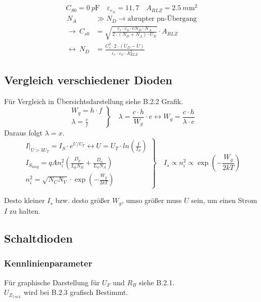 \documentclass[
	a4paper, %
	12pt, %
]{CSUniSchoolLabReport}
\newcommand{\pico}{p}
\newcommand{\milli}{m}
\begin{document}
\vspace{1em} 

\[
C_{S0} = \SI{0}{\pico\farad} \quad \varepsilon _{r_{si}} = 11,7 \quad A_{RLZ} = \SI{2.5}{\milli\metre\squared}
\]
\begin{align*}
N_A &\gg N_D \rightarrow \text{abrupter pn-Übergang} \\
\rightarrow\ C_{s0} &= \sqrt{\frac{\varepsilon_r \cdot \varepsilon_0 \cdot e N_D \cdot N_A}{2 \cdot (N_D + N_A) \cdot U_D}} \cdot A_{RLZ} \\
\leftrightarrow\ N_D &= \frac{C_s^2 \cdot 2 \cdot (U_D - U)}{\varepsilon_r \cdot \varepsilon_0 \cdot A_{RLZ}^2}
\end{align*}

\vspace{1em} 
\subsection{Vergleich verschiedener Dioden}
Für Vergleich in Übersichtsdarstellung siehe B.2.2 Grafik.
\[
\left.
\begin{array}{l}
W_g = h \cdot f \\
\lambda = \frac{c}{f}
\end{array}
\right\}
\quad \lambda = \frac{c\cdot h}{W_g} \cdot e \leftrightarrow W_g = \frac{c \cdot h}{\lambda \cdot e}
\]
Daraus folgt $\lambda = x$. \\

\[
\left.
\begin{array}{l}
I|_{U>3U_T} = I_S\cdot e^{U/U_T} \leftrightarrow U = U_T\cdot ln(\frac{I}{I_S}) \\
I_{S_{lang}} = q A n_i^2 \left( \frac{D_p}{L_p N_D} + \frac{D_n}{L_n N_A} \right) \\
n_i^2 = \sqrt{N_C N_V} \cdot \exp\left(-\frac{W_g}{2kT}\right)
\end{array}
\right\}
\quad I_s \varpropto n_i^2 \varpropto \exp\left(-\frac{W_g}{2kT}\right)
\]

\vspace{1em} 

Desto kleiner $I_s$ bzw. desto größer $W_g$, umso größer muss $U$ sein, um einen Strom $I$ zu halten.  
\subsection{Schaltdioden}
\subsubsection{Kennlinienparameter}
Für graphische Darstellung für $U_F$ und $R_B$ siehe B.2.1. \\
$U_{Z_{\SI{5}{\milli\ampere}}}$ wird bei B.2.3 grafisch Bestimmt. \\
\end{document}
